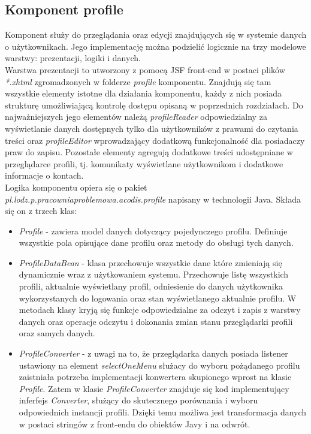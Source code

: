 \documentclass{classrep}
\begin{document}
\subsection{Komponent profile}
Komponent służy do przeglądania oraz edycji znajdujących się w systemie danych o użytkownikach. Jego implementację można podzielić logicznie na trzy modelowe warstwy: prezentacji, logiki i danych. \\
Warstwa prezentacji to utworzony z pomocą JSF front-end w postaci plików \textit{*.xhtml} zgromadzonych w folderze \textit{profile} komponentu. Znajdują się tam wszystkie elementy istotne dla działania komponentu, każdy z nich posiada strukturę umożliwiającą kontrolę dostępu opisaną w poprzednich rozdziałach. Do najważniejszych jego elementów należą \textit{profileReader} odpowiedzialny za wyświetlanie danych dostępnych tylko dla użytkowników z prawami do czytania treści oraz \textit{profileEditor} wprowadzający dodatkową funkcjonalność dla posiadaczy praw do zapisu. Pozostałe elementy agregują dodatkowe treści udostępniane w przeglądarce profili, tj. komunikaty wyświetlane użytkownikom i dodatkowe informacje o kontach. \\
Logika komponentu opiera się o pakiet \textit{pl.lodz.p.pracowniaproblemowa.acodis.profile} napisany w technologii Java. Składa się on z trzech klas:
\begin{itemize}
  \item \textit{Profile} - zawiera model danych dotyczący pojedynczego profilu. Definiuje wszystkie pola opisujące dane profilu oraz metody do obsługi tych danych.
  \item \textit{ProfileDataBean} - klasa przechowuje wszystkie dane które zmieniają się dynamicznie wraz z użytkowaniem systemu. Przechowuje listę wszystkich profili, aktualnie wyświetlany profil, odniesienie do danych użytkownika wykorzystanych do logowania oraz stan wyświetlanego aktualnie profilu. W metodach klasy kryją się funkcje odpowiedzialne za odczyt i zapis z warstwy danych oraz operacje odczytu i dokonania zmian stanu przeglądarki profili oraz samych danych.
  \item \textit{ProfileConverter} - z uwagi na to, że przeglądarka danych posiada listener ustawiony na element \textit{selectOneMenu} służacy do wyboru pożądanego profilu zaistniała potrzeba implementacji konwertera skupionego wprost na klasie \textit{Profile}. Zatem w klasie \textit{ProfileConverter} znajduje się kod implementujący inferfejs \textit{Converter}, służący do skutecznego porównania i wyboru odpowiednich instancji profili. Dzięki temu możliwa jest transformacja danych w postaci stringów z front-endu do obiektów Javy i na odwrót.
\end{itemize}
\end{document}
